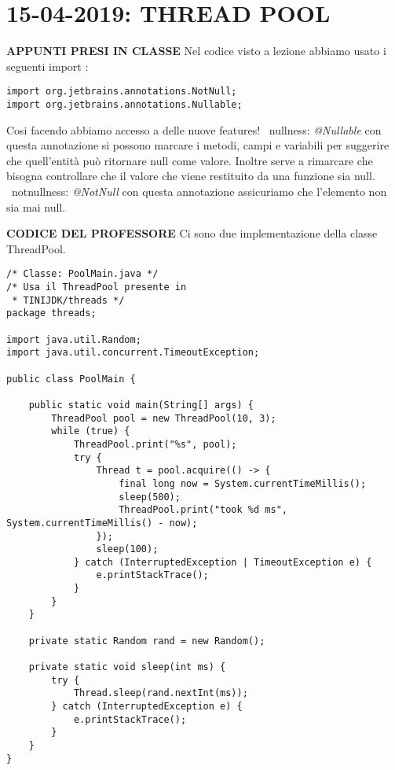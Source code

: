 

\newpage
\section{15-04-2019: THREAD POOL}
\noindent \textbf{APPUNTI PRESI IN CLASSE} \newline
Nel codice visto a lezione abbiamo usato i seguenti import :
\begin{lstlisting}[basicstyle=\small,]
import org.jetbrains.annotations.NotNull;
import org.jetbrains.annotations.Nullable;
\end{lstlisting}
Cosi facendo abbiamo accesso a delle nuove features! \newline
\textbullet\ nullness: \textit{@Nullable} con questa annotazione si possono marcare i metodi, campi e variabili per suggerire che quell'entità può ritornare null come valore. Inoltre serve a rimarcare che bisogna controllare che il valore che viene restituito da una funzione sia null. \newline
\textbullet\ notnullness: \textit{@NotNull} con questa annotazione assicuriamo che l'elemento non sia mai null. \newline

\noindent \textbf{CODICE DEL PROFESSORE} \newline
\noindent Ci sono due implementazione della classe ThreadPool. \newline

\begin{lstlisting}[basicstyle=\small,]
/* Classe: PoolMain.java */
/* Usa il ThreadPool presente in
 * TINIJDK/threads */
package threads;

import java.util.Random;
import java.util.concurrent.TimeoutException;

public class PoolMain {

    public static void main(String[] args) {
        ThreadPool pool = new ThreadPool(10, 3);
        while (true) {
            ThreadPool.print("%s", pool);
            try {
                Thread t = pool.acquire(() -> {
                    final long now = System.currentTimeMillis();
                    sleep(500);
                    ThreadPool.print("took %d ms", System.currentTimeMillis() - now);
                });
                sleep(100);
            } catch (InterruptedException | TimeoutException e) {
                e.printStackTrace();
            }
        }
    }

    private static Random rand = new Random();

    private static void sleep(int ms) {
        try {
            Thread.sleep(rand.nextInt(ms));
        } catch (InterruptedException e) {
            e.printStackTrace();
        }
    }
}
\end{lstlisting}



